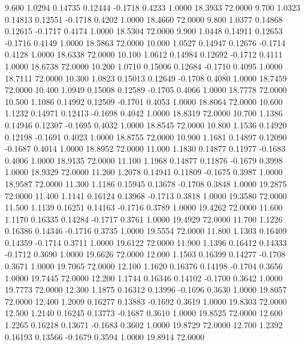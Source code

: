    9.600   1.0294   0.14735   0.12444  -0.1718   0.4233   1.0000  18.3933  72.0000
   9.700   1.0323   0.14813   0.12551  -0.1718   0.4202   1.0000  18.4660  72.0000
   9.800   1.0377   0.14868   0.12615  -0.1717   0.4174   1.0000  18.5304  72.0000
   9.900   1.0448   0.14911   0.12653  -0.1716   0.4149   1.0000  18.5863  72.0000
  10.000   1.0527   0.14947   0.12676  -0.1714   0.4128   1.0000  18.6338  72.0000
  10.100   1.0612   0.14984   0.12692  -0.1712   0.4111   1.0000  18.6738  72.0000
  10.200   1.0710   0.15006   0.12684  -0.1710   0.4095   1.0000  18.7111  72.0000
  10.300   1.0823   0.15013   0.12649  -0.1708   0.4080   1.0000  18.7459  72.0000
  10.400   1.0949   0.15008   0.12589  -0.1705   0.4066   1.0000  18.7778  72.0000
  10.500   1.1086   0.14992   0.12509  -0.1701   0.4053   1.0000  18.8064  72.0000
  10.600   1.1232   0.14971   0.12413  -0.1698   0.4042   1.0000  18.8319  72.0000
  10.700   1.1386   0.14946   0.12307  -0.1695   0.4032   1.0000  18.8545  72.0000
  10.800   1.1536   0.14920   0.12198  -0.1691   0.4023   1.0000  18.8755  72.0000
  10.900   1.1681   0.14897   0.12090  -0.1687   0.4014   1.0000  18.8952  72.0000
  11.000   1.1830   0.14877   0.11977  -0.1683   0.4006   1.0000  18.9135  72.0000
  11.100   1.1968   0.14877   0.11876  -0.1679   0.3998   1.0000  18.9329  72.0000
  11.200   1.2078   0.14941   0.11809  -0.1675   0.3987   1.0000  18.9587  72.0000
  11.300   1.1186   0.15945   0.13678  -0.1708   0.3848   1.0000  19.2875  72.0000
  11.400   1.1141   0.16124   0.13968  -0.1713   0.3818   1.0000  19.3580  72.0000
  11.500   1.1139   0.16251   0.14163  -0.1716   0.3789   1.0000  19.4262  72.0000
  11.600   1.1170   0.16335   0.14284  -0.1717   0.3761   1.0000  19.4929  72.0000
  11.700   1.1226   0.16386   0.14346  -0.1716   0.3735   1.0000  19.5554  72.0000
  11.800   1.1303   0.16409   0.14359  -0.1714   0.3711   1.0000  19.6122  72.0000
  11.900   1.1396   0.16412   0.14333  -0.1712   0.3690   1.0000  19.6626  72.0000
  12.000   1.1503   0.16399   0.14277  -0.1708   0.3671   1.0000  19.7065  72.0000
  12.100   1.1620   0.16376   0.14198  -0.1704   0.3656   1.0000  19.7445  72.0000
  12.200   1.1744   0.16346   0.14102  -0.1700   0.3642   1.0000  19.7773  72.0000
  12.300   1.1875   0.16312   0.13996  -0.1696   0.3630   1.0000  19.8057  72.0000
  12.400   1.2009   0.16277   0.13883  -0.1692   0.3619   1.0000  19.8303  72.0000
  12.500   1.2140   0.16245   0.13773  -0.1687   0.3610   1.0000  19.8525  72.0000
  12.600   1.2265   0.16218   0.13671  -0.1683   0.3602   1.0000  19.8729  72.0000
  12.700   1.2392   0.16193   0.13566  -0.1679   0.3594   1.0000  19.8914  72.0000
